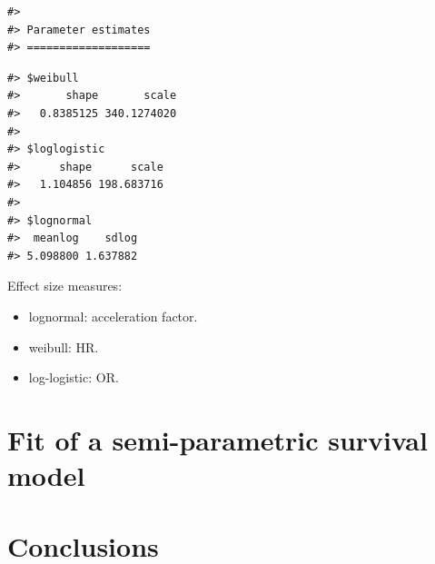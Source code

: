 \documentclass[
]{article}
\providecommand{\tightlist}{%
  \setlength{\itemsep}{0pt}\setlength{\parskip}{0pt}}
\begin{document}
\begin{verbatim}
#> 
#> Parameter estimates
#> ===================
\end{verbatim}

\begin{verbatim}
#> $weibull
#>       shape       scale 
#>   0.8385125 340.1274020 
#> 
#> $loglogistic
#>      shape      scale 
#>   1.104856 198.683716 
#> 
#> $lognormal
#>  meanlog    sdlog 
#> 5.098800 1.637882
\end{verbatim}

Effect size measures:

\begin{itemize}
\tightlist
\item
  lognormal: acceleration factor.
\item
  weibull: HR.
\item
  log-logistic: OR.
\end{itemize}

\hypertarget{fit-of-a-semi-parametric-survival-model}{%
\section{Fit of a semi-parametric survival model}\label{fit-of-a-semi-parametric-survival-model}}

\hypertarget{conclusions}{%
\section{Conclusions}\label{conclusions}}
\end{document}
